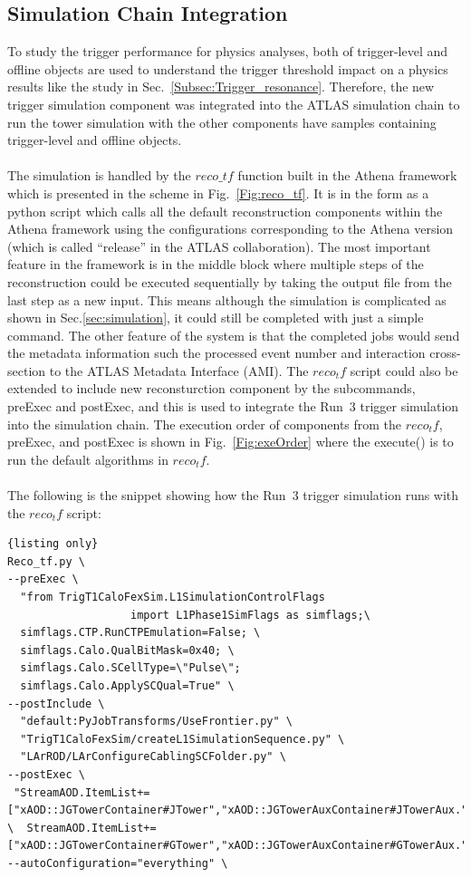 \subsection{Simulation Chain Integration}
To study the trigger performance for physics analyses, both of trigger-level and offline objects are used to understand the trigger threshold impact on a physics results like the study in Sec.~\ref{Subsec:Trigger_resonance}. Therefore, the new trigger simulation component was integrated into the ATLAS simulation chain to run the tower simulation with the other components have samples containing trigger-level and offline objects.   
\\
\\The simulation is handled by the $reco\_tf$ function built in the Athena framework which is presented in the scheme in Fig.~\ref{Fig:reco_tf}. It is in the form as a python script which calls all the default reconstruction components within the Athena framework using the configurations corresponding to the Athena version (which is called ``release'' in the ATLAS collaboration). The most important feature in the framework is in the middle block where multiple steps of the reconstruction could be executed sequentially by taking the output file from the last step as a new input. This means although the simulation is complicated as shown in Sec.\ref{sec:simulation}, it could still be completed with just a simple command. The other feature of the system is that the completed jobs would send the metadata information such the processed event number and interaction cross-section to the ATLAS Metadata Interface (AMI). The $reco_tf$ script could also be extended to include new reconsturction component by the subcommands, preExec and postExec, and this is used to integrate the Run~3 trigger simulation into the simulation chain. The execution order of components from the $reco_tf$, preExec, and postExec is shown in Fig.~\ref{Fig:exeOrder} where the execute() is to run the default algorithms in $reco_tf$. 
\\
\\The following is the snippet showing how the Run~3 trigger simulation runs with the $reco_tf$ script:
\\
\begin{lstlisting}{listing only}
Reco_tf.py \
--preExec \
  "from TrigT1CaloFexSim.L1SimulationControlFlags 
                   import L1Phase1SimFlags as simflags;\ 
  simflags.CTP.RunCTPEmulation=False; \
  simflags.Calo.QualBitMask=0x40; \
  simflags.Calo.SCellType=\"Pulse\";
  simflags.Calo.ApplySCQual=True" \
--postInclude \
  "default:PyJobTransforms/UseFrontier.py" \
  "TrigT1CaloFexSim/createL1SimulationSequence.py" \
  "LArROD/LArConfigureCablingSCFolder.py" \
--postExec \
 "StreamAOD.ItemList+=["xAOD::JGTowerContainer#JTower","xAOD::JGTowerAuxContainer#JTowerAux."]; \  StreamAOD.ItemList+=["xAOD::JGTowerContainer#GTower","xAOD::JGTowerAuxContainer#GTowerAux."]";
--autoConfiguration="everything" \
\end{lstlisting}
